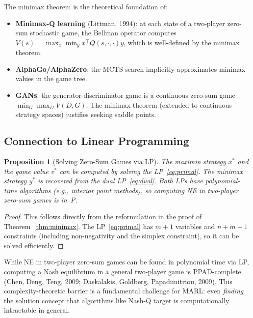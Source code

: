 \documentclass[11pt,a4paper]{article}
\theoremstyle{definition}
\theoremstyle{plain}
\newtheorem{proposition}[theorem]{Proposition}
\theoremstyle{remark}
\begin{document}
\begin{rlconnection}[Minimax in RL]
The minimax theorem is the theoretical foundation of:
\begin{itemize}[nosep]
    \item \textbf{Minimax-Q learning} (Littman, 1994): at each state of a two-player
    zero-sum stochastic game, the Bellman operator computes
    $V(s) = \max_x \min_y x^\top Q(s, \cdot, \cdot) y$, which is well-defined
    by the minimax theorem.
    \item \textbf{AlphaGo/AlphaZero}: the MCTS search implicitly approximates
    minimax values in the game tree.
    \item \textbf{GANs}: the generator-discriminator game is a continuous zero-sum
    game $\min_G \max_D V(D,G)$. The minimax theorem (extended to continuous
    strategy spaces) justifies seeking saddle points.
\end{itemize}
\end{rlconnection}

\subsection{Connection to Linear Programming}
\label{subsec:lp}

\begin{proposition}[Solving Zero-Sum Games via LP]
\label{prop:lp_zerosum}
The maximin strategy $x^*$ and the game value $v^*$ can be computed by solving the
LP~\eqref{eq:primal}. The minimax strategy $y^*$ is recovered from the dual
LP~\eqref{eq:dual}. Both LPs have polynomial-time algorithms (e.g., interior point
methods), so computing NE in two-player zero-sum games is in~P.
\end{proposition}

\begin{proof}
This follows directly from the reformulation in the proof of
Theorem~\ref{thm:minimax}. The LP~\eqref{eq:primal} has $m + 1$ variables and
$n + m + 1$ constraints (including non-negativity and the simplex constraint), so
it can be solved efficiently.
\end{proof}

\begin{warning}
While NE in two-player zero-sum games can be found in polynomial time via LP,
computing a Nash equilibrium in a general two-player game is PPAD-complete
(Chen, Deng, Teng, 2009; Daskalakis, Goldberg, Papadimitriou, 2009). This
complexity-theoretic barrier is a fundamental challenge for MARL: even
\emph{finding} the solution concept that algorithms like Nash-Q target is
computationally intractable in general.
\end{warning}
\end{document}
